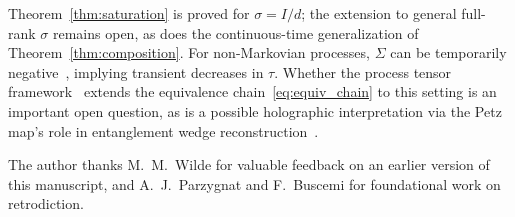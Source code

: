 \documentclass[prl,twocolumn,superscriptaddress,longbibliography,floatfix]{revtex4-2}
\newcommand{\tauasym}{\tau}
\begin{document}
Theorem~\ref{thm:saturation} is proved for $\sigma = I/d$;
the extension to general full-rank $\sigma$ remains open,
as does the continuous-time generalization of
Theorem~\ref{thm:composition}.
For non-Markovian processes, $\Sigma$ can be temporarily
negative~\cite{Breuer2016}, implying transient decreases in
$\tauasym$.  Whether the process tensor
framework~\cite{Pollock2018} extends the equivalence
chain~\eqref{eq:equiv_chain} to this setting is an
important open question, as is a possible holographic
interpretation via the Petz map's role in
entanglement wedge reconstruction~\cite{Chen2020}.

\begin{acknowledgments}
The author thanks M.~M.~Wilde for valuable feedback on an earlier
version of this manuscript, and A.~J.~Parzygnat and F.~Buscemi
for foundational work on retrodiction.
\end{acknowledgments}

\end{document}
